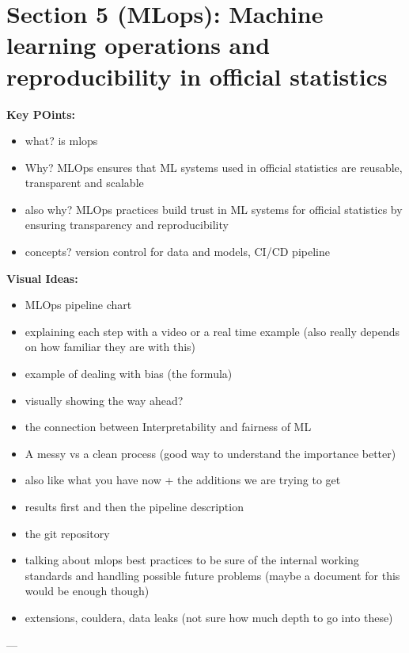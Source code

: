 \documentclass[a4paper,12pt]{article}
\begin{document}
\section{Section 5 (MLops): Machine learning operations and reproducibility in official statistics}
\textbf{Key POints:}
\begin{itemize}[label=\textbullet, leftmargin=1cm]
    \item what? is mlops
    \item Why? MLOps ensures that ML systems used in official statistics are reusable, transparent and scalable
    \item also why? MLOps practices build trust in ML systems for official statistics by ensuring transparency and reproducibility
    \item concepts? version control for data and models, CI/CD pipeline
\end{itemize}

\textbf{Visual Ideas:}
\begin{itemize}[label=$\star$, leftmargin=1cm]
    \item MLOps pipeline chart
    \item explaining each step with a video or a real time example (also really depends on how familiar they are with this)
    \item example of dealing with bias (the formula)
    \item visually showing the way ahead? 
    \item the connection between Interpretability and fairness of ML
    \item A messy vs a clean process (good way to understand the importance better)
    \item also like what you have now + the additions we are trying to get
    \item results first and then the pipeline description
    \item the git repository
    \item talking about mlops best practices to be sure of the internal working standards and handling possible future problems (maybe a document for this would be enough though)
    \item extensions, couldera, data leaks (not sure how much depth to go into these)
\end{itemize}


---
\end{document}
